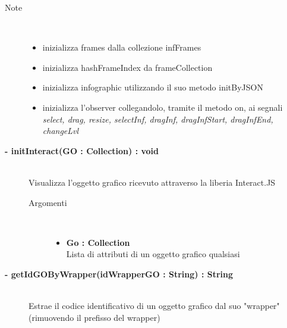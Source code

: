 \begin{description}
\begin{description}
		\begin{description}
			\item[Note] \hfill \\
			\begin{itemize}
					\item inizializza frames dalla collezione infFrames
					\item inizializza hashFrameIndex da frameCollection
					\item inizializza infographic utilizzando il suo metodo initByJSON
					\item inizializza l'observer collegandolo, tramite il metodo on, ai segnali \textit{select, drag, resize, selectInf, dragInf, dragInfStart, dragInfEnd, changeLvl }
			\end{itemize}
		\end{description}
	\end{description}
	
	\begin{description}
		\item[\textbf{\color{blue}- initInteract(GO : Collection) : void		}] \hfill \\
			Visualizza l'oggetto grafico ricevuto attraverso la liberia Interact.JS
			
		\begin{description}
			\item[Argomenti] \hfill \\
				\begin{itemize}
				
					\item \textbf{Go : Collection		} \hfill \\
					Lista di attributi di un oggetto grafico qualsiasi
					
				\end{itemize}
			
		\end{description}
	\end{description}
	
	\begin{description}
		\item[\textbf{\color{blue}- getIdGOByWrapper(idWrapperGO : String) : String		}] \hfill \\
			Estrae il codice identificativo di un oggetto grafico dal suo "wrapper" (rimuovendo il prefisso del wrapper)
			

\end{description}
\end{description}
